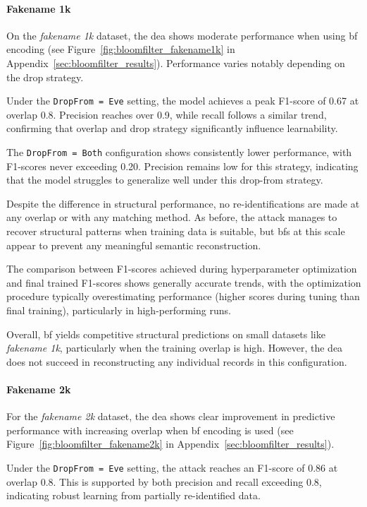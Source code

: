 \paragraph{Fakename 1k}

On the \textit{fakename 1k} dataset, the \ac{dea} shows moderate performance when using \ac{bf} encoding (see Figure~\ref{fig:bloomfilter_fakename1k} in Appendix~\ref{sec:bloomfilter_results}).
Performance varies notably depending on the drop strategy.

Under the \texttt{DropFrom = Eve} setting, the model achieves a peak F1-score of 0.67 at overlap 0.8.
Precision reaches over 0.9, while recall follows a similar trend, confirming that overlap and drop strategy significantly influence learnability.

The \texttt{DropFrom = Both} configuration shows consistently lower performance, with F1-scores never exceeding 0.20.
Precision remains low for this strategy, indicating that the model struggles to generalize well under this drop-from strategy.

Despite the difference in structural performance, no re-identifications are made at any overlap or with any matching method.
As before, the attack manages to recover structural patterns when training data is suitable, but \ac{bf}s at this scale appear to prevent any meaningful semantic reconstruction.

The comparison between F1-scores achieved during hyperparameter optimization and final trained F1-scores shows generally accurate trends, with the optimization procedure typically overestimating performance (higher scores during tuning than final training), particularly in high-performing runs.

Overall, \ac{bf} yields competitive structural predictions on small datasets like \textit{fakename 1k}, particularly when the training overlap is high.
However, the \ac{dea} does not succeed in reconstructing any individual records in this configuration.

\paragraph{Fakename 2k}

For the \textit{fakename 2k} dataset, the \ac{dea} shows clear improvement in predictive performance with increasing overlap when \ac{bf} encoding is used (see Figure~\ref{fig:bloomfilter_fakename2k} in Appendix~\ref{sec:bloomfilter_results}).

Under the \texttt{DropFrom = Eve} setting, the attack reaches an F1-score of 0.86 at overlap 0.8.
This is supported by both precision and recall exceeding 0.8, indicating robust learning from partially re-identified data.


